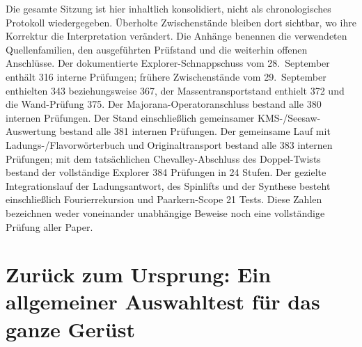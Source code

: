 Die gesamte Sitzung ist hier inhaltlich konsolidiert, nicht als chronologisches Protokoll wiedergegeben. Überholte Zwischenstände bleiben dort sichtbar, wo ihre Korrektur die Interpretation verändert. Die Anhänge benennen die verwendeten Quellenfamilien, den ausgeführten Prüfstand und die weiterhin offenen Anschlüsse. Der dokumentierte Explorer-Schnappschuss vom 28.~September enthält 316 interne Prüfungen; frühere Zwischenstände vom 29.~September enthielten 343 beziehungsweise 367, der Massentransportstand enthielt 372 und die Wand-Prüfung 375. Der Majorana-Operatoranschluss bestand alle 380 internen Prüfungen. Der Stand einschließlich gemeinsamer KMS-/Seesaw-Auswertung bestand alle 381 internen Prüfungen. Der gemeinsame Lauf mit Ladungs-/Flavorwörterbuch und Originaltransport bestand alle 383 internen Prüfungen; mit dem tatsächlichen Chevalley-Abschluss des Doppel-Twists bestand der vollständige Explorer 384 Prüfungen in 24 Stufen. Der gezielte Integrationslauf der Ladungsantwort, des Spinlifts und der Synthese besteht einschließlich Fourierrekursion und Paarkern-Scope 21 Tests. Diese Zahlen bezeichnen weder voneinander unabhängige Beweise noch eine vollständige Prüfung aller Paper.

\tableofcontents
\newpage

\section{Zurück zum Ursprung: Ein allgemeiner Auswahltest für das ganze Gerüst}\label{sec:globaloriginselection}


